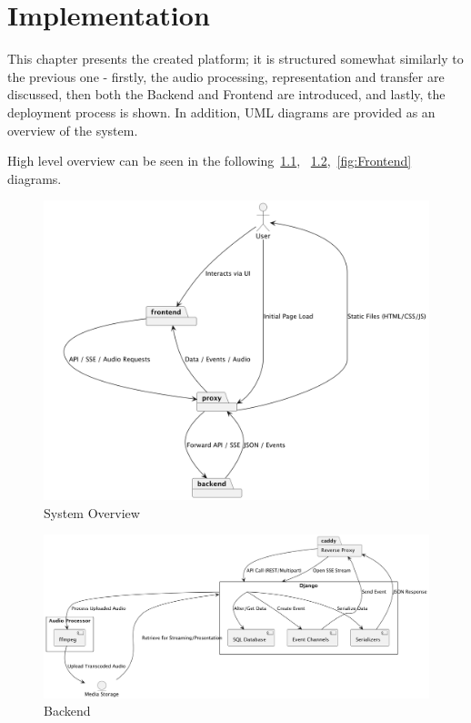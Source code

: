 \chapter{Implementation}\label{ch:implementation}

This chapter presents the created platform; it is structured somewhat similarly to the previous one - firstly, the
audio processing, representation and transfer are discussed, then both the Backend and Frontend are introduced,
and lastly, the deployment process is shown.
In addition, UML diagrams are provided as an overview of the system.

High level overview can be seen in the following~\ref{fig:system_overview},
~\ref{fig:Backend},~\ref{fig:Frontend} diagrams.

\begin{figure}[htbp]
    \centering
    \includegraphics[width=1\textwidth, keepaspectratio]{diagrams/system.png}
    \caption{System Overview}
    \label{fig:system_overview}
\end{figure}

\begin{figure}[htbp]
    \centering
    \includegraphics[width=1\textwidth, keepaspectratio]{diagrams/backend.png}
    \caption{Backend}
    \label{fig:Backend}
\end{figure}


